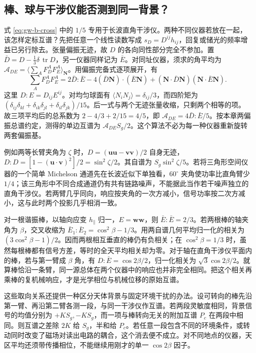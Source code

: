 \subsection{棒、球与干涉仪能否测到同一背景？}
式 \eqref{eq:gw-b-cross} 中的 $1/5$ 专用于长波直角干涉仪。两种不同仪器若放在一起，该怎样定标互谱？先把任意一个线性读数写成 $s_D=D^{ij}h_{ij}$，回复或储光的频率增益已另行除去。张量偏振无迹，故 $D$ 的各向同性部分完全不参加。置 $\bar D=D-\tfrac13\delta\,\operatorname{tr}D$，另一仪器同样记为 $\bar E$。对同址仪器，须求的角平均为 $\mathcal A_{DE}=\langle\sum_A F_D^AF_E^A\rangle_{\bm N}$。用偏振完备式逐项展开，有
\[
 \sum_A F_D^AF_E^A
 =2\bar D:\bar E-4(\bar D\bm N)\cdot(\bar E\bm N)
       +(\bm N\cdot\bar D\bm N)(\bm N\cdot\bar E\bm N).
\]
这里 $D:E=D_{ij}E^{ij}$。对均匀球面有 $\langle N_iN_j\rangle=\delta_{ij}/3$，而四阶矩为 $(\delta_{ij}\delta_{kl}+\delta_{ik}\delta_{jl}+\delta_{il}\delta_{jk})/15$。后一式与两个无迹张量收缩，只剩两个相等的项。故三项平均后的总系数为 $2-4/3+2/15=4/5$，即 $\mathcal A_{DE}=4\bar D:\bar E/5$。按本章两偏振总谱约定，测得的单边互谱为 $\mathcal A_{DE}S_g/2$。这个算法不必为每一种仪器重新旋转两套偏振基。

例如两等长臂夹角为 $\zeta$ 时，$D=(\bm u\bm u-\bm v\bm v)/2$ 自身无迹，$D:D=[1-(\bm u\cdot\bm v)^2]/2=\sin^2\zeta/2$。其自谱为 $S_g\sin^2\zeta/5$。若将三角形空间仪器的一个简单 Michelson 通道先在长波近似下单独看，$60^\circ$ 夹角使功率比直角臂少 $1/4$；该三角形中不同合成通道仍有共有链路噪声，不能据此当作若干噪声独立的直角干涉仪。若两臂几乎同向，响应按夹角的一次方减小，信号功率按二次方减小，这与此时两个投影几乎相消一致。

对一根谐振棒，以轴向应变 $h_\parallel$ 归一，$E=\bm w\bm w$，则 $\bar E:\bar E=2/3$。若两根棒的轴夹角为 $\beta$，交叉收缩为 $\bar E_1:\bar E_2=\cos^2\beta-1/3$。用两自谱几何平均归一化的相关为 $(3\cos^2\beta-1)/2$。因而两根相互垂直的棒仍有负相关；在 $\cos^2\beta=1/3$ 时，虽然每根棒都有信号方差，等时的全天平均相关却为零。对于轴在直角干涉仪平面内的棒，若与第一臂成 $\beta$ 角，有 $D:\bar E=\cos2\beta/2$，归一化相关为 $\sqrt3\cos2\beta/2$。就算棒恰沿一条臂，同一源总体在两个仪器中的响应也并非完全相同。把这个相关再乘棒的复机械响应，才是光学相位与机械位移的原始互谱。

这些取向关系还提供一种区分天体背景与固定环境干扰的办法。设可转向的棒先沿第一臂、再沿第二臂各测一段，与同一干涉仪作互谱。若两段灵敏度相同，背景信号的均值分别为 $+K S_g,-K S_g$，而一项与棒转向无关的附加互谱 $P_c$ 在两段中相同。则互谱之差除 $2K$ 给 $S_g$，半和给 $P_c$。若任意一段包含不同的环境条件，或转动同时改变了磁场对读出电路的耦合，这个消去便不成立。对不同地点的仪器，天区平均还须带传播相位，不能继续用刚才的单一 $\cos2\beta$ 因子。

